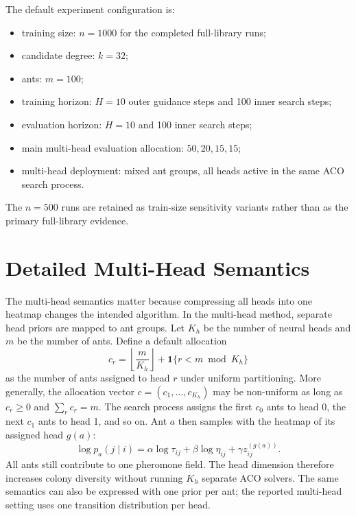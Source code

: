 \documentclass[11pt]{article}
\begin{document}
The default experiment configuration is:
\begin{itemize}
    \item training size: $n=1000$ for the completed full-library runs;
    \item candidate degree: $k=32$;
    \item ants: $m=100$;
    \item training horizon: $H=10$ outer guidance steps and 100 inner search steps;
    \item evaluation horizon: $H=10$ and 100 inner search steps;
    \item main multi-head evaluation allocation: $50,20,15,15$;
    \item multi-head deployment: mixed ant groups, all heads active in the same ACO search process.
\end{itemize}
The $n=500$ runs are retained as train-size sensitivity variants rather than as the primary full-library evidence.

\section{Detailed Multi-Head Semantics}
\label{app:multihead-semantics}

The multi-head semantics matter because compressing all heads into one heatmap changes the intended algorithm.
In the multi-head method, separate head priors are mapped to ant groups.
Let $K_h$ be the number of neural heads and $m$ be the number of ants.
Define a default allocation
\begin{equation}
c_r
=
\left\lfloor \frac{m}{K_h}\right\rfloor
+
\mathbf{1}\{r < m \bmod K_h\}
\end{equation}
as the number of ants assigned to head $r$ under uniform partitioning.
More generally, the allocation vector $c=(c_1,\ldots,c_{K_h})$ may be non-uniform as long as $c_r\geq 0$ and $\sum_r c_r=m$.
The search process assigns the first $c_0$ ants to head 0, the next $c_1$ ants to head 1, and so on.
Ant $a$ then samples with the heatmap of its assigned head $g(a)$:
\begin{equation}
\log p_a(j \mid i)
=
\alpha \log \tau_{ij}
+
\beta \log \eta_{ij}
+
\gamma z^{(g(a))}_{ij}.
\end{equation}
All ants still contribute to one pheromone field.
The head dimension therefore increases colony diversity without running $K_h$ separate ACO solvers.
The same semantics can also be expressed with one prior per ant; the reported multi-head setting uses one transition distribution per head.
\end{document}
